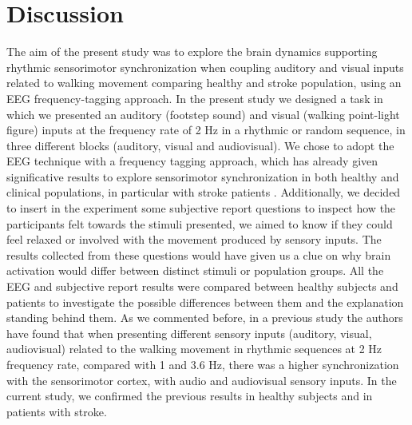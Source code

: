 \chapter{Discussion}
The aim of the present study was to explore the brain dynamics supporting rhythmic sensorimotor synchronization when coupling auditory and visual inputs related to walking movement comparing healthy and stroke population, using an EEG frequency-tagging approach. 
In the present study we designed a task in which we presented an auditory (footstep sound) and visual (walking point-light figure) inputs at the frequency rate of 2 Hz in a rhythmic or random sequence, in three different blocks (auditory, visual and audiovisual). We chose to adopt the EEG technique with a frequency tagging approach, which has already given significative results to explore sensorimotor synchronization in both healthy \parencite{Cracco_2022} and clinical populations, in particular with stroke patients \parencite{Nozaradan_2017}. 
Additionally, we decided to insert in the experiment some subjective report questions to inspect how the participants felt towards the stimuli presented, we aimed to know if they could feel relaxed or involved with the movement produced by sensory inputs. The results collected from these questions would have given us a clue on why brain activation would differ between distinct stimuli or population groups. 
All the EEG and subjective report results were compared between healthy subjects and patients to investigate the possible differences between them and the explanation standing behind them.
As we commented before, in a previous study the authors have found that when presenting different sensory inputs (auditory, visual, audiovisual) related to the walking movement in rhythmic sequences at 2 Hz frequency rate, compared with 1 and 3.6 Hz, there was a higher synchronization with the sensorimotor cortex, with audio and audiovisual sensory inputs.
In the current study, we confirmed the previous results in healthy subjects and in patients with stroke. 

